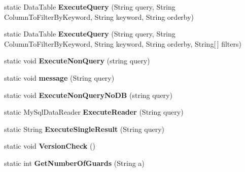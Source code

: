 \begin{DoxyCompactItemize}
static Data\+Table {\bfseries Execute\+Query} (String query, String Column\+To\+Filter\+By\+Keyword, String keyword, String orderby)
\item 
\mbox{\label{class_m_s_a_m_i_s_user_interface_1_1_s_q_l_tools_a77241611666c69632a894a2ecba717d0}} 
static Data\+Table {\bfseries Execute\+Query} (String query, String Column\+To\+Filter\+By\+Keyword, String keyword, String orderby, String\mbox{[}$\,$\mbox{]} filters)
\item 
\mbox{\label{class_m_s_a_m_i_s_user_interface_1_1_s_q_l_tools_aa95b0ea1da7ca3fcdad6ad6b7bbff7d7}} 
static void {\bfseries Execute\+Non\+Query} (string query)
\item 
\mbox{\label{class_m_s_a_m_i_s_user_interface_1_1_s_q_l_tools_a151245390168bcda7a2daec2b769d1f4}} 
static void {\bfseries message} (String query)
\item 
\mbox{\label{class_m_s_a_m_i_s_user_interface_1_1_s_q_l_tools_a047c767c6fea606d2f3c24e5d75dcb64}} 
static void {\bfseries Execute\+Non\+Query\+No\+DB} (string query)
\item 
\mbox{\label{class_m_s_a_m_i_s_user_interface_1_1_s_q_l_tools_a7501877c86d32bb56b2167d690574bb3}} 
static My\+Sql\+Data\+Reader {\bfseries Execute\+Reader} (String query)
\item 
\mbox{\label{class_m_s_a_m_i_s_user_interface_1_1_s_q_l_tools_a34d2efaf4eb1d06991716f4da5ff5869}} 
static String {\bfseries Execute\+Single\+Result} (String query)
\item 
\mbox{\label{class_m_s_a_m_i_s_user_interface_1_1_s_q_l_tools_a062af4c67152fc1406c0591c6ba5e121}} 
static void {\bfseries Version\+Check} ()
\item 
\mbox{\label{class_m_s_a_m_i_s_user_interface_1_1_s_q_l_tools_a388585a5a4c195615e84dc56390a2157}} 
static int {\bfseries Get\+Number\+Of\+Guards} (String a)

\end{DoxyCompactItemize}

